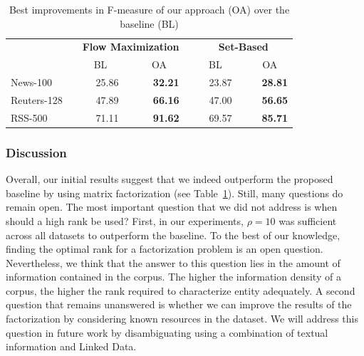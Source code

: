 \documentclass{llncs}
\begin{document}
\begin{table}[htb]
    \caption{Best improvements in F-measure of our approach (OA) over the baseline (BL)}
    \begin{tabular}{lp{1cm}p{0.25cm}rp{1cm}p{0.25cm}rp{1cm}p{0.25cm}rp{1cm}p{0.25cm}r}
    \toprule
     && \multicolumn{5}{c}{\textbf{Flow Maximization}} && \multicolumn{5}{c}{\textbf{Set-Based}} \\
     && \multicolumn{2}{c}{BL} && \multicolumn{2}{c}{OA} && \multicolumn{2}{c}{BL} && \multicolumn{2}{c}{OA} \\
    \midrule
    News-100        &&& 25.86  &&& \textbf{32.21} &&& 23.87  &&& \textbf{28.81} \\
	Reuters-128     &&& 47.89  &&& \textbf{66.16} &&& 47.00  &&& \textbf{56.65} \\
	RSS-500         &&& 71.11  &&& \textbf{91.62} &&& 69.57  &&& \textbf{85.71} \\
	\bottomrule
	\end{tabular}
	\centering
	\label{tab:improvements}
\end{table}


\subsubsection{Discussion}
Overall, our initial results suggest that we indeed outperform the proposed baseline by using matrix factorization (see Table~\ref{tab:improvements}).
Still, many questions do remain open.
The most important question that we did not address is when should a high rank be used?
First, in our experiments, $\rho=10$ was sufficient across all datasets to outperform the baseline. 
To the best of our knowledge, finding the optimal rank for a factorization problem is an open question.
Nevertheless, we think that the answer to this question lies in the amount of information contained in the corpus.
The higher the information density of a corpus, the higher the rank required to characterize entity adequately.
A second question that remains unanswered is whether we can improve the results of the factorization by considering known resources in the dataset.
We will address this question in future work by disambiguating using a combination of textual information and Linked Data.
\end{document}
